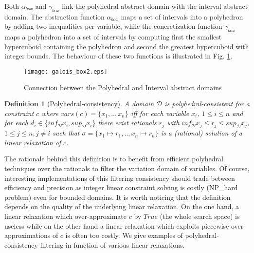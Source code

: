 \documentclass[submission,copyright,creativecommons]{eptcs}
\newtheorem{definition}{Definition}
\begin{document}
\noindent
Both $\alpha_{box}$ and $\gamma_{box}$ link the polyhedral abstract domain with the interval abstract domain.
The abstraction function $\alpha_{box}$ maps a set of intervals into a polyhedron by adding two inequalities per variable, while
the concretization function $\gamma_{box}$ maps a polyhedron into a set of intervals by computing first the smallest hypercuboid 
containing the polyhedron and second the greatest hypercuboid with integer bounds.
The behaviour of these two functions is illustrated in Fig. \ref{fig:galois_box}.


\begin{figure} 
  \begin{center} 
   \texttt{[image: galois\_box2.eps]} 
  \end{center} 
  \caption{Connection between the Polyhedral and Interval abstract domains} 
  \label{fig:galois_box} 
\end{figure} 


\begin{definition}[Polyhedral-consistency]
A domain $\mathcal{D}$ is polyhedral-consistent for a constraint $c$ where $vars(c)=\{x_1,..,x_n\}$ 
iff for each variable $x_i$, $1 \leq i \leq n$ and for each $d_i \in \{inf_{\mathcal{D}} x_i, sup_{\mathcal{D}} x_i\}$
there exist rationals $r_j$ with $inf_{\mathcal{D}} x_j\leq r_j \leq sup_{\mathcal{D}} x_j$, $1 \leq j \leq n, j \neq i$
such that $\sigma = \{x_1 \mapsto r_1, ..,x_n \mapsto r_n\}$ is a (rational) solution of a linear relaxation of $c$.
\end{definition} 
\noindent
The rationale behind this definition is to benefit from efficient polyhedral techniques over the rationals to filter 
the variation domain of variables. Of course, interesting implementations of this filtering consistency should trade 
between efficiency and precision as integer linear constraint solving is costly (NP\_hard problem) even for bounded domains.  
It is worth noticing that the definition depends on the quality of the underlying linear relaxation. On the one hand, a
linear relaxation which over-approximate $c$ by $True$ (the whole search space) is useless while on the other hand 
a linear relaxation which exploits piecewise over-approximations of $c$ is often too costly. 
We give examples of polyhedral-consistency filtering in function of various linear relaxations.
\end{document}
